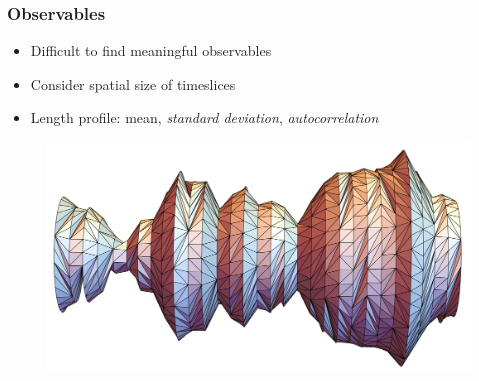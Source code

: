 \begin{frame}
    \frametitle{Observables}

    
    \begin{itemize}
        \item Difficult to find meaningful observables
        \item Consider spatial size of timeslices
        \item Length profile: mean, \emph{standard deviation}, \emph{autocorrelation}
    \end{itemize}
    \begin{figure}
       \centering
       \includegraphics[width=0.6\linewidth]{img/triangulation.pdf}    
    \end{figure}
\end{frame}



